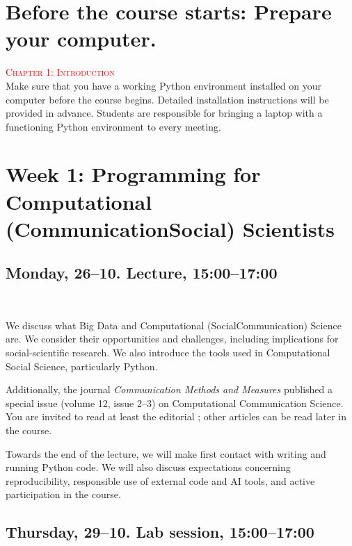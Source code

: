 \newcommand{\mandatoryreading}[1]{\textcolor{red}{\textsc{\ding{52} #1}}}

\section*{Before the course starts: Prepare your computer.}

\mandatoryreading{Chapter 1: Introduction}\\
Make sure that you have a working Python environment installed on your computer before the course begins. Detailed installation instructions will be provided in advance. Students are responsible for bringing a laptop with a functioning Python environment to every meeting.


\section*{Week 1: Programming for Computational (Communication\textbar Social) Scientists}

\subsection*{Monday, 26--10. Lecture, 15:00--17:00}

\mandatoryreading{\cite{Kitchin2014}}\\
\mandatoryreading{\cite{Hilbert2019}}

We discuss what Big Data and Computational (Social\textbar Communication) Science are. We consider their opportunities and challenges, including implications for social-scientific research. We also introduce the tools used in Computational Social Science, particularly Python.

Additionally, the journal \textit{Communication Methods and Measures} published a special issue (volume 12, issue 2--3) on Computational Communication Science. You are invited to read at least the editorial \citep{VanAtteveldt2018a}; other articles can be read later in the course.

Towards the end of the lecture, we will make first contact with writing and running Python code. We will also discuss expectations concerning reproducibility, responsible use of external code and AI tools, and active participation in the course.

\subsection*{Thursday, 29--10. Lab session, 15:00--17:00}

